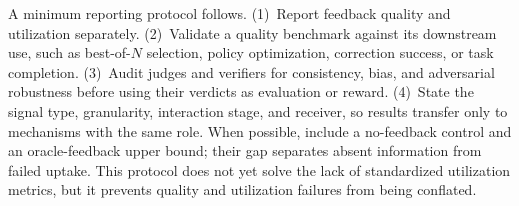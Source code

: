 A minimum reporting protocol follows. (1)~Report feedback quality and utilization separately. (2)~Validate a quality benchmark against its downstream use, such as best-of-$N$ selection, policy optimization, correction success, or task completion. (3)~Audit judges and verifiers for consistency, bias, and adversarial robustness before using their verdicts as evaluation or reward. (4)~State the signal type, granularity, interaction stage, and receiver, so results transfer only to mechanisms with the same role. When possible, include a no-feedback control and an oracle-feedback upper bound; their gap separates absent information from failed uptake. This protocol does not yet solve the lack of standardized utilization metrics, but it prevents quality and utilization failures from being conflated.
